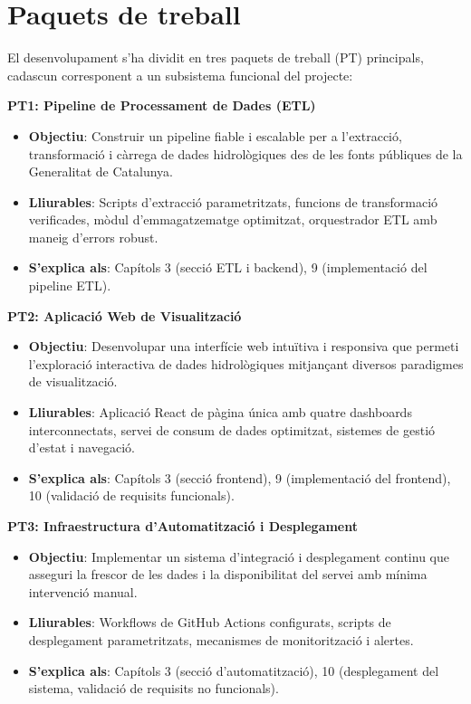 \section{Paquets de treball}

El desenvolupament s'ha dividit en tres paquets de treball (PT) principals, cadascun corresponent a un subsistema funcional del projecte:

\textbf{PT1: Pipeline de Processament de Dades (ETL)}
\begin{itemize}
    \item \textbf{Objectiu}: Construir un pipeline fiable i escalable per a l'extracció, transformació i càrrega de dades hidrològiques des de les fonts públiques de la Generalitat de Catalunya.
    \item \textbf{Lliurables}: Scripts d'extracció parametritzats, funcions de transformació verificades, mòdul d'emmagatzematge optimitzat, orquestrador ETL amb maneig d'errors robust.
    \item \textbf{S'explica als}: Capítols 3 (secció ETL i backend), 9 (implementació del pipeline ETL).
\end{itemize}

\textbf{PT2: Aplicació Web de Visualització}
\begin{itemize}
    \item \textbf{Objectiu}: Desenvolupar una interfície web intuïtiva i responsiva que permeti l'exploració interactiva de dades hidrològiques mitjançant diversos paradigmes de visualització.
    \item \textbf{Lliurables}: Aplicació React de pàgina única amb quatre dashboards interconnectats, servei de consum de dades optimitzat, sistemes de gestió d'estat i navegació.
    \item \textbf{S'explica als}: Capítols 3 (secció frontend), 9 (implementació del frontend), 10 (validació de requisits funcionals).
\end{itemize}

\textbf{PT3: Infraestructura d'Automatització i Desplegament}
\begin{itemize}
    \item \textbf{Objectiu}: Implementar un sistema d'integració i desplegament continu que asseguri la frescor de les dades i la disponibilitat del servei amb mínima intervenció manual.
    \item \textbf{Lliurables}: Workflows de GitHub Actions configurats, scripts de desplegament parametritzats, mecanismes de monitorització i alertes.
    \item \textbf{S'explica als}: Capítols 3 (secció d'automatització), 10 (desplegament del sistema, validació de requisits no funcionals).
\end{itemize}

